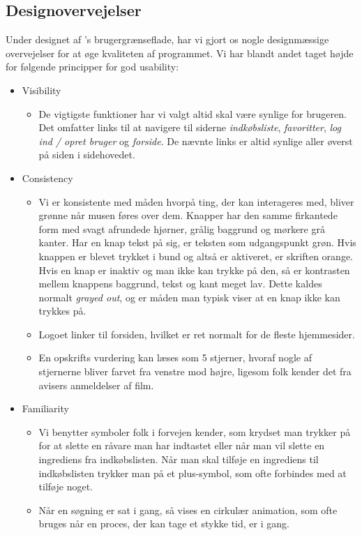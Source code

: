 \subsection{Designovervejelser}
\label{subsec:designovervejelser}

Under designet af \Foodl's brugergrænseflade, har vi gjort os nogle designmæssige overvejelser for at øge kvaliteten af programmet. Vi har blandt andet taget højde for følgende principper for god usability\cite[p.~123]{deb}:
\begin{itemize}

\item Visibility
  \begin{itemize}
  \item De vigtigste funktioner har vi valgt altid skal være synlige for brugeren. Det omfatter links til at navigere til siderne \textit{indkøbsliste}, \textit{favoritter}, \textit{log ind / opret bruger} og \textit{forside}. De nævnte links er altid synlige aller øverst på siden i sidehovedet.
  \end{itemize}
  
\item Consistency
  \begin{itemize}
  \item Vi er konsistente med måden hvorpå ting, der kan interageres med, bliver grønne når musen føres over dem. Knapper har den samme firkantede form med svagt afrundede hjørner, grålig baggrund og mørkere grå kanter. Har en knap tekst på sig, er teksten som udgangspunkt grøn. Hvis knappen er blevet trykket i bund og altså er aktiveret, er skriften orange. Hvis en knap er inaktiv og man ikke kan trykke på den, så er kontrasten mellem knappens baggrund, tekst og kant meget lav. Dette kaldes normalt \textit{grayed out}, og er måden man typisk viser at en knap ikke kan trykkes på.
  \item Logoet linker til forsiden, hvilket er ret normalt for de fleste hjemmesider.
  \item En opskrifts vurdering kan læses som 5 stjerner, hvoraf nogle af stjernerne bliver farvet fra venstre mod højre, ligesom folk kender det fra \fx avisers anmeldelser af film.
  \end{itemize}
  
\item Familiarity
  \begin{itemize}
  \item Vi benytter symboler folk i forvejen kender, som \fx krydset man trykker på for at slette en råvare man har indtastet eller når man vil slette en ingrediens fra indkøbslisten. Når man skal tilføje en ingrediens til indkøbslisten trykker man på et plus-symbol, som ofte forbindes med at tilføje noget.
  \item Når en søgning er sat i gang, så vises en cirkulær animation, som ofte bruges når en proces, der kan tage et stykke tid, er i gang.   
  \end{itemize}
  

\end{itemize}
